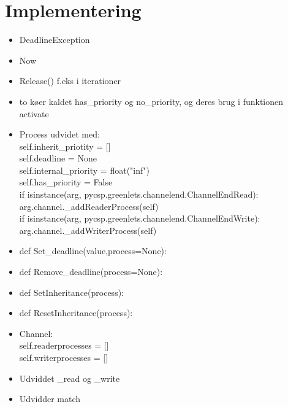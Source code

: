 \section{Implementering}

\begin{itemize}
\item DeadlineException
\item Now
\item Release() f.eks i iterationer
\item to køer kaldet has\_priority og no\_priority, og deres brug i funktionen activate
\item Process udvidet med: \\self.inherit\_priotity = []     \\
        self.deadline = None\\
        self.internal\_priority = float("inf")\\
        self.has\_priority = False\\
            if isinstance(arg, pycsp.greenlets.channelend.ChannelEndRead):\\
                arg.channel.\_addReaderProcess(self)\\
            if isinstance(arg, pycsp.greenlets.channelend.ChannelEndWrite):\\
                arg.channel.\_addWriterProcess(self)
\item def Set\_deadline(value,process=None):
\item def Remove\_deadline(process=None):
\item def SetInheritance(process):
\item def ResetInheritance(process):
\item Channel:\\
        self.readerprocesses = []\\
        self.writerprocesses = []

\item Udviddet _read og _write
\item Udvidder match


\end{itemize}
